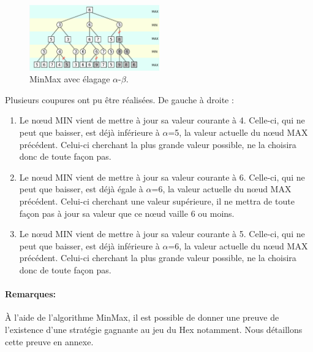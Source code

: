 \begin{figure}[h]
    \begin{center}
        \includegraphics[width=0.5\textwidth]{root/minmax_alpha_beta.png}
    \end{center}
    \caption{MinMax avec élagage $\alpha$-$\beta$.}\label{fig:min_max_alpha_beta}
\end{figure}


Plusieurs coupures ont pu être réalisées. De gauche à droite :
\begin{enumerate}
    \item Le nœud MIN vient de mettre à jour sa valeur courante à 4. Celle-ci, qui ne peut que baisser, est déjà inférieure à $\alpha$=5, 
    la valeur actuelle du nœud MAX précédent. Celui-ci cherchant la plus grande valeur possible, ne la choisira donc de toute façon pas.
    \item Le nœud MIN vient de mettre à jour sa valeur courante à 6. Celle-ci, qui ne peut que baisser, est déjà égale à $\alpha$=6, la valeur 
    actuelle du nœud MAX précédent. Celui-ci cherchant une valeur supérieure, il ne mettra de toute façon pas à jour sa valeur que ce nœud 
    vaille 6 ou moins.
    \item Le nœud MIN vient de mettre à jour sa valeur courante à 5. Celle-ci, qui ne peut que baisser, est déjà inférieure à $\alpha$=6, la valeur 
    actuelle du nœud MAX précédent. Celui-ci cherchant la plus grande valeur possible, ne la choisira donc de toute façon pas.
\end{enumerate}

\paragraph{Remarques:}
À l'aide de l'algorithme MinMax, il est possible de donner une preuve de l'existence d'une stratégie gagnante au jeu du Hex notamment. Nous détaillons
cette preuve en annexe.
